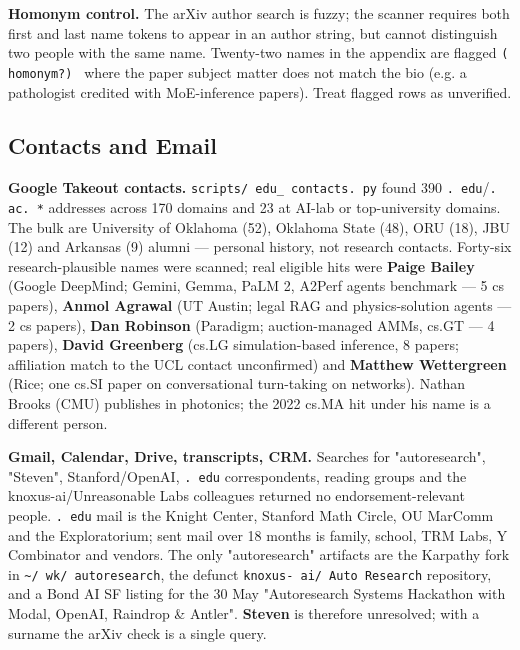 \documentclass[twocolumn,10pt,letterpaper]{article}
\begin{document}
\textbf{Homonym control.} The arXiv author search is fuzzy; the scanner requires both first and last name tokens to appear in an author string, but cannot distinguish two people with the same name. Twenty-two names in the appendix are flagged \texttt{( homonym?) } where the paper subject matter does not match the bio (e.g. a pathologist credited with MoE-inference papers). Treat flagged rows as unverified.


\subsection{Contacts and Email}

\textbf{Google Takeout contacts.} \texttt{scripts/ edu\_ contacts. py} found 390 \texttt{. edu}/\texttt{. ac. *} addresses across 170 domains and 23 at AI-lab or top-university domains. The bulk are University of Oklahoma (52), Oklahoma State (48), ORU (18), JBU (12) and Arkansas (9) alumni — personal history, not research contacts. Forty-six research-plausible names were scanned; real eligible hits were \textbf{Paige Bailey} (Google DeepMind; Gemini, Gemma, PaLM 2, A2Perf agents benchmark — 5 cs papers), \textbf{Anmol Agrawal} (UT Austin; legal RAG and physics-solution agents — 2 cs papers), \textbf{Dan Robinson} (Paradigm; auction-managed AMMs, cs.GT — 4 papers), \textbf{David Greenberg} (cs.LG simulation-based inference, 8 papers; affiliation match to the UCL contact unconfirmed) and \textbf{Matthew Wettergreen} (Rice; one cs.SI paper on conversational turn-taking on networks). Nathan Brooks (CMU) publishes in photonics; the 2022 cs.MA hit under his name is a different person.


\textbf{Gmail, Calendar, Drive, transcripts, CRM.} Searches for "autoresearch", "Steven", Stanford/OpenAI, \texttt{. edu} correspondents, reading groups and the knoxus-ai/Unreasonable Labs colleagues returned no endorsement-relevant people. \texttt{. edu} mail is the Knight Center, Stanford Math Circle, OU MarComm and the Exploratorium; sent mail over 18 months is family, school, TRM Labs, Y Combinator and vendors. The only "autoresearch" artifacts are the Karpathy fork in \texttt{\textasciitilde{}/ wk/ autoresearch}, the defunct \texttt{knoxus- ai/ Auto Research} repository, and a Bond AI SF listing for the 30 May "Autoresearch Systems Hackathon with Modal, OpenAI, Raindrop \& Antler". \textbf{Steven} is therefore unresolved; with a surname the arXiv check is a single query.
\end{document}

